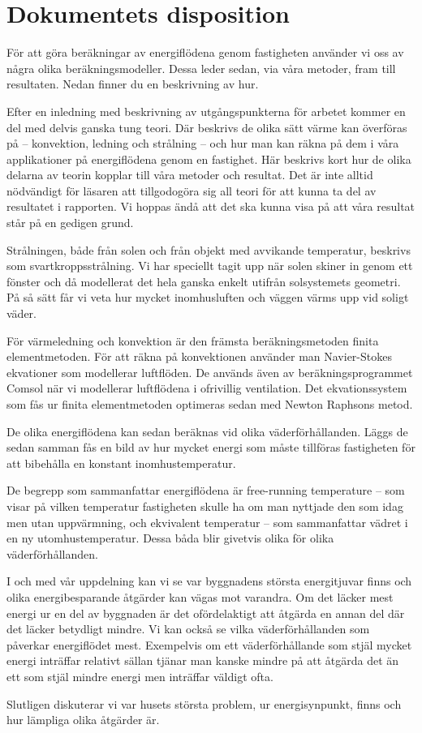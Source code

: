 \section{Dokumentets disposition}

För att göra beräkningar av energiflödena genom fastigheten använder vi oss av några olika beräkningsmodeller. Dessa leder sedan, via våra metoder, fram till resultaten. Nedan finner du en beskrivning av hur.

Efter en inledning med beskrivning av utgångspunkterna för arbetet kommer en del med
 delvis ganska tung teori. Där beskrivs de olika sätt värme kan överföras på – konvektion,
  ledning och strålning – och hur man kan räkna på dem i våra applikationer på 
  energiflödena genom en fastighet. Här beskrivs kort hur de olika delarna av teorin 
  kopplar till våra metoder och resultat. Det är inte alltid nödvändigt för läsaren att 
  tillgodogöra sig all teori för att kunna ta del av resultatet i rapporten. Vi hoppas ändå att 
  det ska kunna visa på att våra resultat står på en gedigen grund.

Strålningen, både från solen och från objekt med avvikande temperatur, beskrivs som 
svartkroppsstrålning. Vi har speciellt tagit upp när solen skiner in genom ett fönster och då 
modellerat det hela ganska enkelt utifrån solsystemets geometri. På så sätt får vi veta hur 
mycket inomhusluften och väggen värms upp vid soligt väder.

För värmeledning och konvektion är den främsta beräkningsmetoden finita 
elementmetoden. För att räkna på konvektionen använder man Navier-Stokes ekvationer 
som modellerar luftflöden. De används även av beräkningsprogrammet Comsol när vi 
modellerar luftflödena i ofrivillig ventilation. Det ekvationssystem som fås ur finita
 elementmetoden optimeras sedan med Newton Raphsons metod.

De olika energiflödena kan sedan beräknas vid olika väderförhållanden. Läggs de 
sedan samman fås en bild av hur mycket energi som måste tillföras fastigheten för att 
bibehålla en konstant inomhustemperatur.

De begrepp som sammanfattar energiflödena är free-running temperature – som visar på 
vilken temperatur fastigheten skulle ha om man nyttjade den som idag men utan 
uppvärmning, och ekvivalent temperatur – som sammanfattar vädret i en ny utomhustemperatur. Dessa båda blir givetvis olika för olika väderförhållanden.

I och med vår uppdelning kan vi se var byggnadens största energitjuvar finns och 
olika energibesparande åtgärder kan vägas mot varandra. Om det läcker mest energi ur
 en del av byggnaden är det ofördelaktigt att åtgärda en annan del där det läcker betydligt
  mindre. Vi kan också se vilka väderförhållanden som påverkar energiflödet mest. 
Exempelvis om ett väderförhållande som stjäl mycket energi inträffar relativt sällan tjänar
 man kanske mindre på att åtgärda det än ett som stjäl mindre energi men inträffar väldigt 
 ofta.

Slutligen diskuterar vi var husets största problem, ur energisynpunkt, finns och hur lämpliga olika åtgärder är.
